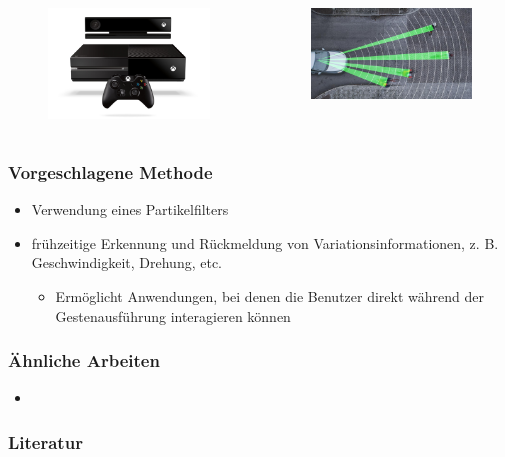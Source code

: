 \documentclass{beamer}
\begin{document}
\begin{frame}
\begin{itemize}
\begin{itemize}
\end{itemize}
\end{itemize}
\begin{columns}
\begin{column}{0.4\textwidth}
\begin{figure}
\centering
\includegraphics[width=0.7\linewidth]{../Bilder/xbox}
\label{fig:xbox}
\end{figure}
\end{column}
\begin{column}{0.4\textwidth}
\begin{figure}
\centering
\includegraphics[width=0.7\linewidth]{../Bilder/fussgaenger}
\label{fig:fussgaenger}
\end{figure}
\end{column}
\end{columns}
\end{frame}
\begin{frame}\frametitle{Vorgeschlagene Methode}
\begin{itemize}
\item Verwendung eines Partikelfilters
\item frühzeitige Erkennung und Rückmeldung von Variationsinformationen, z. B. Geschwindigkeit, Drehung, etc.
\begin{itemize}
\item Ermöglicht Anwendungen, bei denen die Benutzer direkt während der Gestenausführung interagieren können
\end{itemize}
\end{itemize}
\end{frame}
\begin{frame}\frametitle{Ähnliche Arbeiten}
\begin{itemize}
\item \citet{Wobbrock2007}
\end{itemize}
\end{frame}

\begin{frame}\frametitle{Literatur}



\end{frame}
\end{document}
